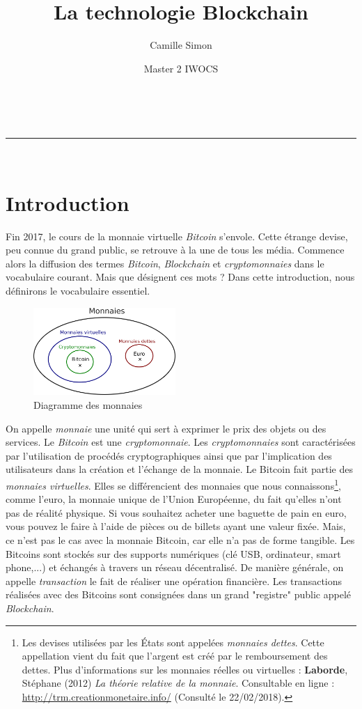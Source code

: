 \documentclass{article}
\title{La technologie Blockchain}
\author{Camille Simon}
\date{Master 2 IWOCS}
\makeatletter
\newcommand{\linia}{\rule{\linewidth}{0.5pt}}
\renewcommand{\maketitle}{
    \begin{center}
    \vspace{2ex}
    {\huge \textsc{\@title}}
    \vspace{1ex}
    \\
    \linia\\
    \@author \hfill \@date
    \vspace{4ex}
    \end{center}
}
\makeatother
\begin{document}
\maketitle

\section*{Introduction}

Fin 2017, le cours de la monnaie virtuelle \textit{Bitcoin} s'envole. Cette étrange devise, peu connue du grand public, se retrouve à la une de tous les média. Commence alors la diffusion des termes \textit{Bitcoin}, \textit{Blockchain} et \textit{cryptomonnaies} dans le vocabulaire courant. Mais que désignent ces mots ? Dans cette introduction, nous définirons le vocabulaire essentiel.

\begin{figure}
    \vspace{-10pt}
    \centering
    \includegraphics[width=0.48\textwidth]{schema-monnaies.png}
    \caption{Diagramme des monnaies}
    \vspace{-15pt}
\end{figure}

On appelle \textit{monnaie} une unité qui sert à exprimer le prix des objets ou des services. Le \textit{Bitcoin} est une \textit{cryptomonnaie}. Les \textit{cryptomonnaies} sont caractérisées par l'utilisation de procédés cryptographiques ainsi que par l'implication des utilisateurs dans la création et l'échange de la monnaie. Le Bitcoin fait partie des \textit{monnaies virtuelles}. Elles se différencient des monnaies que nous connaissons\footnote{Les devises utilisées par les États sont appelées \textit{monnaies dettes}. Cette appellation vient du fait que l'argent est créé par le remboursement des dettes. Plus d'informations sur les monnaies réelles ou virtuelles : \textbf{Laborde}, Stéphane (2012) \textit{La théorie relative de la monnaie}. Consultable en ligne : \url{http://trm.creationmonetaire.info/} (Consulté le 22/02/2018).}, comme l'euro, la monnaie unique de l'Union Européenne, du fait qu'elles n'ont pas de réalité physique. Si vous souhaitez acheter une baguette de pain en euro, vous pouvez le faire à l'aide de pièces ou de billets ayant une valeur fixée. Mais, ce n'est pas le cas avec la monnaie Bitcoin, car elle n'a pas de forme tangible. Les Bitcoins sont stockés sur des supports numériques (clé USB, ordinateur, smart phone,...) et échangés à travers un réseau décentralisé. De manière générale, on appelle \textit{transaction} le fait de réaliser une opération financière. Les transactions réalisées avec des Bitcoins sont consignées dans un grand "registre" public appelé \textit{Blockchain}. 
\end{document}
